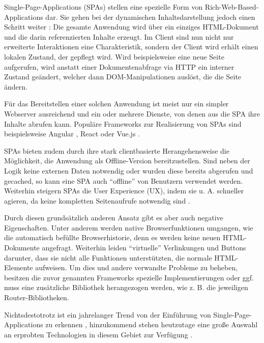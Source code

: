 Single-Page-Applications (SPAs) stellen eine spezielle Form von Rich-Web-Based-Applications dar. Sie gehen bei der dynamischen Inhaltsdarstellung jedoch einen Schritt weiter \cite{SinglePageApplication}: Die gesamte Anwendung wird über ein einziges HTML-Dokument und die darin referenzierten Inhalte erzeugt. Im Client sind nun nicht nur erweiterte Interaktionen eine Charakteristik, sondern der Client wird erhält einen lokalen Zustand, der gepflegt wird. Wird beispielsweise eine neue Seite aufgerufen, wird anstatt einer Dokumentenabfrage via HTTP ein interner Zustand geändert, welcher dann DOM-Manipulationen auslöst, die die Seite ändern.

Für das Bereitstellen einer solchen Anwendung ist meist nur ein simpler Webserver ausreichend und ein oder mehrere Dienste, von denen aus die SPA ihre Inhalte abrufen kann. Populäre Frameworks zur Realisierung von SPAs sind beispielsweise Angular \cite{AngularHomepage}, React \cite{ReactHomepage} oder Vue.js \cite{VueJSHomepage}.

SPAs bieten zudem durch ihre stark clientbasierte Herangehensweise die Möglichkeit, die Anwendung als Offline-Version bereitzustellen. Sind neben der Logik keine externen Daten notwendig oder wurden diese bereits abgerufen und gecached, so kann eine SPA auch \enquote{offline} von Benutzern verwendet werden. Weiterhin steigern SPAs die User Experience (UX), indem sie u. A. schneller agieren, da keine kompletten Seitenaufrufe notwendig sind \cite{ImprovementOfAcedemicServiceBasedOnSPA}.

Durch diesen grundsätzlich anderen Ansatz gibt es aber auch negative Eigenschaften. Unter anderem werden native Browserfunktionen umgangen, wie die automatisch befüllte Browserhistorie, denn es werden keine neuen HTML-Dokumente angefragt. Weiterhin leiden \enquote{virtuelle} Verlinkungen und Buttons darunter, dass sie nicht alle Funktionen unterstützten, die normale HTML-Elemente aufweisen. Um dies und andere verwandte Probleme zu beheben, besitzen die zuvor genannten Frameworks spezielle Implementierungen oder ggf. muss eine zusätzliche Bibliothek herangezogen werden, wie z. B. die jeweiligen Router-Bibliotheken.

Nichtsdestotrotz ist ein jahrelanger Trend von der Einführung von Single-Page-Applications zu erkennen \cite{SinglePageApplication}, hinzukommend stehen heutzutage eine große Auswahl an erprobten Technologien in diesem Gebiet zur Verfügung \cite{TheStateOfJavaScript2020}.

